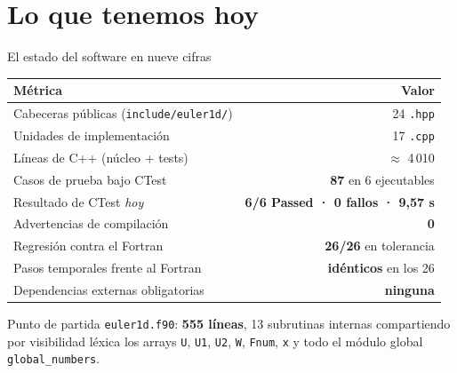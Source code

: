 \documentclass[aspectratio=169,10pt]{beamer}
\newcommand{\cod}[1]{\texttt{\small #1}}
\begin{document}
\section{Lo que tenemos hoy}

\begin{frame}[shrink]{El estado del software en nueve cifras}
  \centering
  \small
  \begin{tabular}{@{}lr@{}}
    \toprule
    \textbf{Métrica} & \textbf{Valor} \\
    \midrule
    Cabeceras públicas (\cod{include/euler1d/})      & 24 \cod{.hpp} \\
    Unidades de implementación                        & 17 \cod{.cpp} \\
    Líneas de C++ (núcleo + tests)                    & $\approx$ 4\,010 \\
    \midrule
    Casos de prueba bajo CTest                        & \textbf{87} en 6 ejecutables \\
    Resultado de CTest \emph{hoy}                     & \textbf{6/6 Passed · 0 fallos · 9{,}57 s} \\
    Advertencias de compilación                       & \textbf{0} \\
    \midrule
    Regresión contra el Fortran                       & \textbf{26/26} en tolerancia \\
    Pasos temporales frente al Fortran                & \textbf{idénticos} en los 26 \\
    Dependencias externas obligatorias                & \textbf{ninguna} \\
    \bottomrule
  \end{tabular}

  \vspace{0.6em}
  \begin{block}{Punto de partida}
    \small
    \cod{euler1d.f90}: \textbf{555 líneas}, 13 subrutinas internas compartiendo
    por visibilidad léxica los arrays \cod{U}, \cod{U1}, \cod{U2}, \cod{W},
    \cod{Fnum}, \cod{x} y todo el módulo global \cod{global\_numbers}.
  \end{block}
\end{frame}
\end{document}

